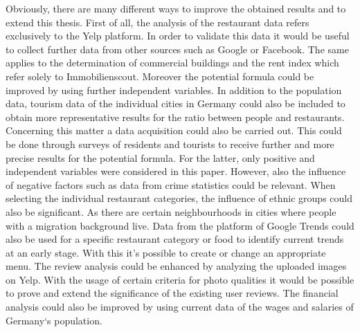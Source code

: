 Obviously, there are many different ways to improve the obtained results and to extend this thesis. First of all, the analysis of the restaurant data refers exclusively to the Yelp platform. In order to validate this data it would be useful to collect further data from other sources such as Google or Facebook. The same applies to the determination of commercial buildings and the rent index which refer solely to Immobilienscout. \newline
Moreover the potential formula could be improved by using further independent variables. In addition to the population data, tourism data of the individual cities in Germany could also be included to obtain more representative results for the ratio between people and restaurants. Concerning this matter a data acquisition could also be carried out. This could be done through surveys of residents and tourists to receive further and more precise results for the potential formula. For the latter, only positive and independent variables were considered in this paper. However, also the influence of negative factors such as data from crime statistics could be relevant. \newline
When selecting the individual restaurant categories, the influence of ethnic groups could also be significant. As there are certain neighbourhoods in cities where people with a migration background live. Data from the platform of Google Trends could also be used for a specific restaurant category or food to identify current trends at an early stage. With this it's possible to create or change an appropriate menu. \newline
The review analysis could be enhanced by analyzing the uploaded images on Yelp. With the usage of certain criteria for photo qualities it would be possible to prove and extend the significance of the existing user reviews. The financial analysis could also be improved by using current data of the wages and salaries of Germany‘s population.